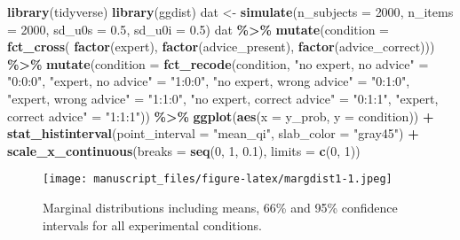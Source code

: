 \documentclass[
  man,floatsintext]{apa6}
\newenvironment{Shaded}{\begin{snugshade}}{\end{snugshade}}
\newcommand{\AttributeTok}[1]{\textcolor[rgb]{0.13,0.29,0.53}{#1}}
\newcommand{\DecValTok}[1]{\textcolor[rgb]{0.00,0.00,0.81}{#1}}
\newcommand{\FloatTok}[1]{\textcolor[rgb]{0.00,0.00,0.81}{#1}}
\newcommand{\FunctionTok}[1]{\textcolor[rgb]{0.13,0.29,0.53}{\textbf{#1}}}
\newcommand{\NormalTok}[1]{#1}
\newcommand{\OtherTok}[1]{\textcolor[rgb]{0.56,0.35,0.01}{#1}}
\newcommand{\SpecialCharTok}[1]{\textcolor[rgb]{0.81,0.36,0.00}{\textbf{#1}}}
\newcommand{\StringTok}[1]{\textcolor[rgb]{0.31,0.60,0.02}{#1}}
\begin{document}
\begin{Shaded}
\begin{Highlighting}[]
\FunctionTok{library}\NormalTok{(tidyverse)}
\FunctionTok{library}\NormalTok{(ggdist)}
\NormalTok{dat }\OtherTok{\textless{}{-}} \FunctionTok{simulate}\NormalTok{(}\AttributeTok{n\_subjects =} \DecValTok{2000}\NormalTok{, }\AttributeTok{n\_items =} \DecValTok{2000}\NormalTok{, }\AttributeTok{sd\_u0s =} \FloatTok{0.5}\NormalTok{, }\AttributeTok{sd\_u0i =} \FloatTok{0.5}\NormalTok{)}
\NormalTok{dat }\SpecialCharTok{\%\textgreater{}\%} 
  \FunctionTok{mutate}\NormalTok{(}\AttributeTok{condition =} \FunctionTok{fct\_cross}\NormalTok{(}
    \FunctionTok{factor}\NormalTok{(expert), }\FunctionTok{factor}\NormalTok{(advice\_present), }\FunctionTok{factor}\NormalTok{(advice\_correct))) }\SpecialCharTok{\%\textgreater{}\%}
  \FunctionTok{mutate}\NormalTok{(}\AttributeTok{condition =} \FunctionTok{fct\_recode}\NormalTok{(condition,}
    \StringTok{"no expert, no advice"} \OtherTok{=} \StringTok{"0:0:0"}\NormalTok{, }\StringTok{"expert, no advice"} \OtherTok{=} \StringTok{"1:0:0"}\NormalTok{, }
    \StringTok{"no expert, wrong advice"} \OtherTok{=} \StringTok{"0:1:0"}\NormalTok{, }\StringTok{"expert, wrong advice"} \OtherTok{=} \StringTok{"1:1:0"}\NormalTok{,}
    \StringTok{"no expert, correct advice"} \OtherTok{=} \StringTok{"0:1:1"}\NormalTok{, }\StringTok{"expert, correct advice"} \OtherTok{=} \StringTok{"1:1:1"}\NormalTok{)) }\SpecialCharTok{\%\textgreater{}\%} 
  \FunctionTok{ggplot}\NormalTok{(}\FunctionTok{aes}\NormalTok{(}\AttributeTok{x =}\NormalTok{ y\_prob, }\AttributeTok{y =}\NormalTok{ condition)) }\SpecialCharTok{+}
  \FunctionTok{stat\_histinterval}\NormalTok{(}\AttributeTok{point\_interval =} \StringTok{"mean\_qi"}\NormalTok{, }\AttributeTok{slab\_color =} \StringTok{"gray45"}\NormalTok{) }\SpecialCharTok{+}
  \FunctionTok{scale\_x\_continuous}\NormalTok{(}\AttributeTok{breaks =} \FunctionTok{seq}\NormalTok{(}\DecValTok{0}\NormalTok{, }\DecValTok{1}\NormalTok{, }\FloatTok{0.1}\NormalTok{), }\AttributeTok{limits =} \FunctionTok{c}\NormalTok{(}\DecValTok{0}\NormalTok{, }\DecValTok{1}\NormalTok{))}
\end{Highlighting}
\end{Shaded}

\begin{figure}
\centering
\texttt{[image: manuscript\_files/figure-latex/margdist1-1.jpeg]}
\caption{\label{fig:margdist1}Marginal distributions including means, 66\% and 95\% confidence intervals for all experimental conditions.}
\end{figure}
\end{document}
